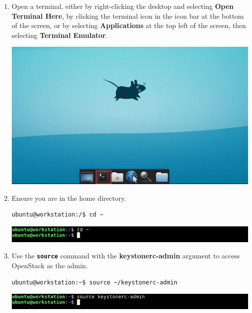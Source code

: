 \documentclass[letterpaper, 12pt]{article}
\begin{document}
\begin{enumerate}    
    \item Open a terminal, either by right-clicking the desktop and selecting \textbf{Open Terminal Here}, by clicking
    the terminal icon in the icon bar at the bottom of the screen, or by selecting \textbf{Applications} at the top
    left of the screen, then selecting \textbf{Terminal Emulator}.

    \begin{center}
        \includegraphics[width=\linewidth]{images/part2/step1.png}
    \end{center}

    \item Ensure you are in the home directory.
\begin{lstlisting}
ubuntu@workstation:/$ cd ~
\end{lstlisting}
    
    \begin{center}
        \includegraphics[width=\linewidth]{images/part2/step2.png}
    \end{center}

    \item Use the \textbf{\texttt{source}} command with the \textbf{keystonerc-admin} argument to access OpenStack
    as the admin.
\begin{lstlisting}
ubuntu@workstation:~$ source ~/keystonerc-admin
\end{lstlisting}
    
    \begin{center}
        \includegraphics[width=\linewidth]{images/part2/step3.png}
    \end{center}


\end{enumerate}
\end{document}
